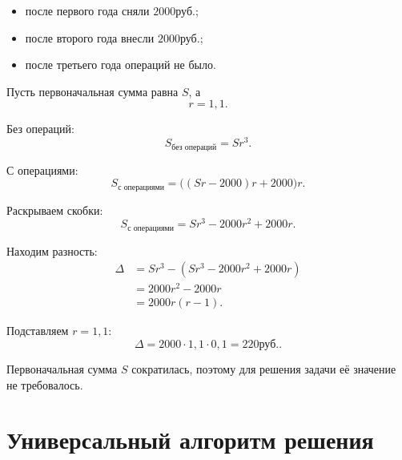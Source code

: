 \documentclass[a4paper,12pt]{article}
\newcommand{\RUB}{\text{руб.}}
\begin{document}
\begin{itemize}
  \item после первого года сняли \(2000\RUB\);
  \item после второго года внесли \(2000\RUB\);
  \item после третьего года операций не было.
\end{itemize}

Пусть первоначальная сумма равна \(S\), а
\[
r=1{,}1.
\]

Без операций:
\[
S_{\text{без операций}}=Sr^3.
\]

С операциями:
\[
S_{\text{с операциями}}
=
\bigl((Sr-2000)r+2000\bigr)r.
\]

Раскрываем скобки:
\[
S_{\text{с операциями}}
=
Sr^3-2000r^2+2000r.
\]

Находим разность:
\begin{align*}
\Delta
&=
Sr^3-\left(Sr^3-2000r^2+2000r\right)\\
&=
2000r^2-2000r\\
&=
2000r(r-1).
\end{align*}

Подставляем \(r=1{,}1\):
\[
\Delta
=
2000\cdot1{,}1\cdot0{,}1
=
220\RUB.
\]

Первоначальная сумма \(S\) сократилась, поэтому для решения задачи её значение
не требовалось.

\section{Универсальный алгоритм решения}
\end{document}

